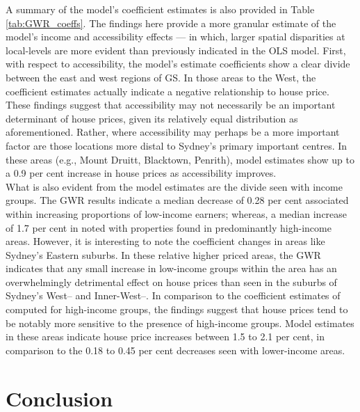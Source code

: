 A summary of the model's coefficient estimates is also provided in Table \ref{tab:GWR_coeffs}. The findings here provide a more granular estimate of the model's income and accessibility effects --- in which, larger spatial disparities at local-levels are more evident than previously indicated in the OLS model. First, with respect to accessibility, the model's estimate coefficients  show a clear divide between the east and west regions of GS. In those areas to the West, the coefficient estimates actually indicate a negative relationship to house price. These findings suggest that accessibility may not necessarily be an important determinant of house prices, given its relatively equal distribution as aforementioned. Rather, where accessibility may perhaps be a more important factor are those locations more distal to Sydney's primary important centres. In these areas (e.g., Mount Druitt, Blacktown, Penrith), model estimates show up to a 0.9 per cent increase in house prices as accessibility improves. \\

What is also evident from the model estimates are the divide seen with income groups. The GWR results indicate a median decrease of 0.28 per cent associated within increasing proportions of low-income earners; whereas, a median increase of 1.7 per cent in noted with properties found in predominantly high-income areas. However, it is interesting to note the coefficient changes in areas like Sydney's Eastern suburbs. In these relative higher priced areas, the GWR indicates that any small increase in low-income groups within the area has an overwhelmingly detrimental effect on house prices than seen in the suburbs of Sydney's West-- and Inner-West--. In comparison to the coefficient estimates of computed for high-income groups, the findings suggest that house prices tend to be notably more sensitive to the presence of high-income groups. Model estimates in these areas indicate house price increases between 1.5 to 2.1 per cent, in comparison to the 0.18 to 0.45 per cent decreases seen with lower-income areas.

\section{Conclusion}
 
 